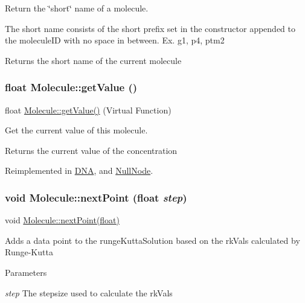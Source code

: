 Return the \char`\"{}short\char`\"{} name of a molecule.

The short name consists of the short prefix set in the constructor appended to the moleculeID with no space in between. Ex. g1, p4, ptm2

\begin{DoxyReturn}{Returns}
the short name of the current molecule 
\end{DoxyReturn}
\hypertarget{classMolecule_a554ea822918374775d5f52b5d49d8195}{
\subsubsection[{getValue}]{\setlength{\rightskip}{0pt plus 5cm}float Molecule::getValue ()}}
\label{classMolecule_a554ea822918374775d5f52b5d49d8195}
float \hyperlink{classMolecule_a554ea822918374775d5f52b5d49d8195}{Molecule::getValue()} (Virtual Function)

Get the current value of this molecule.

\begin{DoxyReturn}{Returns}
the current value of the concentration 
\end{DoxyReturn}


Reimplemented in \hyperlink{classDNA_ac3f4ef00894483313ea44df6a85b3bab}{DNA}, and \hyperlink{classNullNode_ae1cddbf915028ab4f2aebf6879c6a682}{NullNode}.\hypertarget{classMolecule_af67c8a4dcbde3f500509ee1bd94ff4ef}{
\subsubsection[{nextPoint}]{\setlength{\rightskip}{0pt plus 5cm}void Molecule::nextPoint (float {\em step})}}
\label{classMolecule_af67c8a4dcbde3f500509ee1bd94ff4ef}
void \hyperlink{classMolecule_af67c8a4dcbde3f500509ee1bd94ff4ef}{Molecule::nextPoint(float)}

Adds a data point to the rungeKuttaSolution based on the rkVals calculated by Runge-\/Kutta


\begin{DoxyParams}{Parameters}
\item[{\em step}]The stepsize used to calculate the rkVals \end{DoxyParams}


